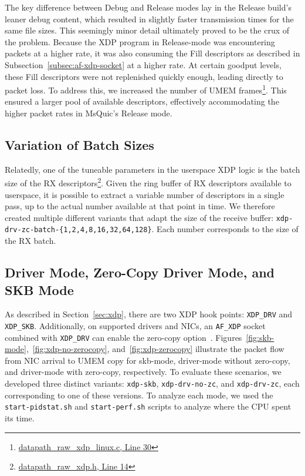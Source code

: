 The key difference between Debug and Release modes lay in the Release build's leaner debug content, which resulted in slightly faster transmission times for the same file sizes. This seemingly minor detail ultimately proved to be the crux of the problem. Because the \ac{XDP} program in Release-mode was encountering packets at a higher rate, it was also consuming the Fill descriptors as described in Subsection~\ref{subsec:af-xdp-socket} at a higher rate. At certain goodput levels, these Fill descriptors were not replenished quickly enough, leading directly to packet loss. To address this, we increased the number of UMEM frames\footnote{\href{https://github.com/microsoft/msquic/blob/1160b80e09eda16d365b76491c798e9db9f47275/src/platform/datapath_raw_xdp_linux.c\#L30}{datapath\_raw\_xdp\_linux.c, Line 30}}. This ensured a larger pool of available descriptors, effectively accommodating the higher packet rates in MsQuic's Release mode.

\subsection{Variation of Batch Sizes}
\label{subsec:variation-of-batch-sizes}
Relatedly, one of the tuneable parameters in the userspace \ac{XDP} logic is the batch size of the RX descriptors\footnote{\href{https://github.com/microsoft/msquic/blob/1160b80e09eda16d365b76491c798e9db9f47275/src/platform/datapath_raw_xdp.h\#L14}{datapath\_raw\_xdp.h, Line 14}}. Given the ring buffer of RX descriptors available to userspace, it is possible to extract a variable number of descriptors in a single pass, up to the actual number available at that point in time. We therefore created multiple different variants that adapt the size of the receive buffer: \texttt{xdp-drv-zc-batch-\{1,2,4,8,16,32,64,128\}}. Each number corresponds to the size of the RX batch.

\subsection{Driver Mode, Zero-Copy Driver Mode, and SKB Mode}
\label{subsec:driver-mode-skb-mode}
As described in Section~\ref{sec:xdp}, there are two \ac{XDP} hook points: \texttt{XDP\_DRV} and \texttt{XDP\_SKB}. Additionally, on supported drivers and \ac{NIC}s, an \texttt{AF\_XDP} socket combined with \texttt{XDP\_DRV} can enable the zero-copy option~\cite{af_xdp_concept}. Figures~\ref{fig:skb-mode},~\ref{fig:xdp-no-zerocopy}, and~\ref{fig:xdp-zerocopy} illustrate the packet flow from \ac{NIC} arrival to UMEM copy for skb-mode, driver-mode without zero-copy, and driver-mode with zero-copy, respectively. To evaluate these scenarios, we developed three distinct variants: \texttt{xdp-skb}, \texttt{xdp-drv-no-zc}, and \texttt{xdp-drv-zc}, each corresponding to one of these versions. To analyze each mode, we used the \texttt{start-pidstat.sh} and \texttt{start-perf.sh} scripts to analyze where the CPU spent its time.

